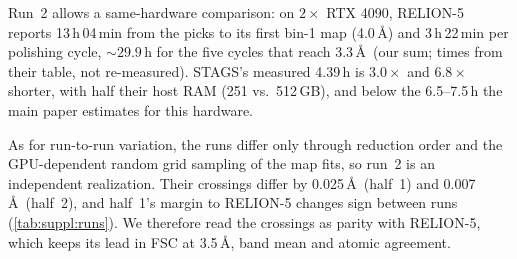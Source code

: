 


Run~2 allows a same-hardware comparison: on $2\times$ RTX 4090, RELION-5~\cite{burt2024relion5} reports 13\,h\,04\,min from the picks to its first bin-1 map (4.0\,\AA) and 3\,h\,22\,min per polishing cycle, ${\sim}29.9$\,h for the five cycles that reach 3.3\,\AA\ (our sum; times from their table, not re-measured).
STAGS's measured 4.39\,h is $3.0\times$ and $6.8\times$ shorter, with half their host RAM (251 vs.\ 512\,GB), and below the 6.5--7.5\,h the main paper estimates for this hardware.

As for run-to-run variation, the runs differ only through reduction order and the GPU-dependent random grid sampling of the map fits, so run~2 is an independent realization.
Their crossings differ by 0.025\,\AA\ (half~1) and 0.007\,\AA\ (half~2), and half~1's margin to RELION-5 changes sign between runs (\cref{tab:suppl:runs}).
We therefore read the crossings as parity with RELION-5, which keeps its lead in FSC at 3.5\,\AA, band mean and atomic agreement.

